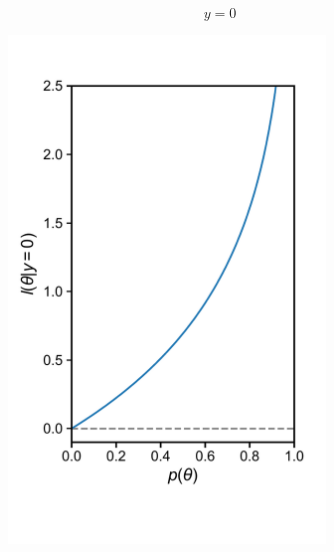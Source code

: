 \documentclass[10pt,aspectratio=169]{beamer}
\begin{document}
\begin{frame}
\begin{columns}[T]
          \begin{column}{0.5\textwidth}
            \begin{equation*}
              y = 0
            \end{equation*}
            \vspace{-4em}
            \begin{figure}[t]
              \includegraphics[width=0.75\textwidth]{scripts/loss_2.pdf}
            \end{figure}
          \end{column}
          
        \end{columns}
      \end{frame}
\end{document}
